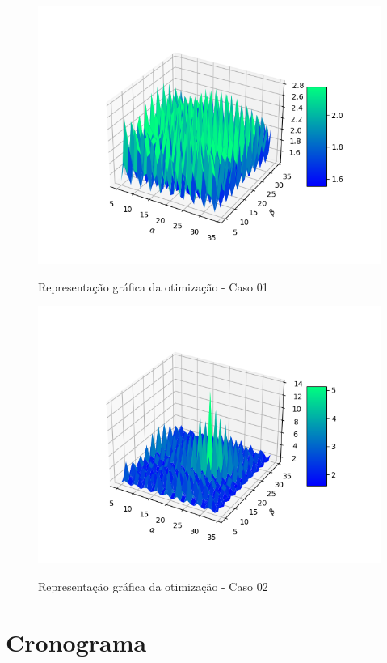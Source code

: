 \documentclass[deposito, acronym, symbols]{fei}
\begin{document}
\begin{figure}[!htb]
    \centering
    \caption{Representação gráfica da otimização - Caso 01}
    \includegraphics[scale=0.8]{Imagens/Figure_0_5_Vy.png}
    \label{fig:angulo0.5}
\end{figure}

\begin{figure}[!htb]
    \centering
    \caption{Representação gráfica da otimização - Caso 02}
    \includegraphics[scale=0.8]{Imagens/Figure_0_1_Vy.png}
    \label{fig:angulo0.1}
\end{figure}

\chapter{Cronograma}
\end{document}

